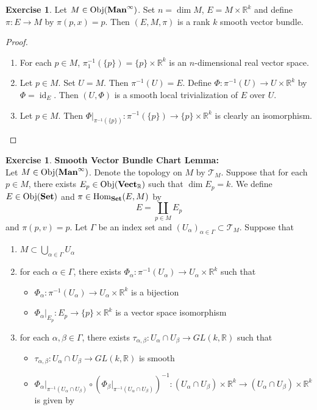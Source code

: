 \documentclass{book}
\theoremstyle{definition}
\newtheorem{ex}[definition]{Exercise}
\newcommand{\al}{\alpha}
\newcommand{\be}{\beta}
\newcommand{\Gam}{\Gamma}
\newcommand{\R}{\mathbb{R}}
\newcommand{\MT}{\mathcal{T}}
\DeclareMathOperator{\id}{id}
\DeclareMathOperator{\Obj}{Obj}
\DeclareMathOperator{\Hom}{Hom}
\DeclareMathOperator*{\Set}{\text{\tbf{Set}}}
\DeclareMathOperator*{\Maninf}{\text{\tbf{Man}}^{\infty}}
\DeclareMathOperator*{\VectR}{\text{\tbf{Vect}}_{\R}}
\DeclareMathOperator*{\0}{\mbf{0}}
\DeclareMathOperator*{\1}{\mbf{1}}
\newcommand{\tbf}[1]{\textbf{#1}}
\begin{document}
\begin{ex}
Let $M \in \Obj(\Maninf)$. Set $n = \dim M$, $E = M \times \R^k$ and define $\pi: E \rightarrow M$ by $\pi(p, x) = p $. Then $(E, M, \pi)$ is a rank $k$ smooth vector bundle.
\end{ex}

\begin{proof}\
\begin{enumerate}
\item For each $p \in M$, $\pi_1^{-1}(\{p\}) = \{p\} \times \R^k$ is an $n$-dimensional real vector space.
\item Let $p \in M$. Set $U = M$. Then $\pi^{-1}(U) = E$. Define $\Phi: \pi^{-1}(U) \rightarrow U \times \R^k$ by $\Phi = \id_E$. Then $(U, \Phi)$ is a smooth local trivialization of $E$ over $U$.   
\item Let $p \in M$. Then $\Phi|_{\pi^{-1}(\{p\})}: \pi^{-1}(\{p\}) \rightarrow \{p\} \times \R^k$ is clearly an isomorphism. 
\end{enumerate}
\end{proof}


\begin{ex} \tbf{Smooth Vector Bundle Chart Lemma:} \\
	Let $M \in \Obj(\Maninf)$. Denote the topology on $M$ by $\MT_M$. Suppose that for each $p \in M$, there exists $E_p \in \Obj(\VectR)$ such that $\dim E_p = k$. We define $E \in \Obj(\Set)$ and $\pi \in \Hom_{\Set}(E, M)$ by
	$$E = \coprod_{p \in M} E_p$$ 
	and 
	$\pi(p, v) = p$. Let $\Gam$ be an index set and $(U_{\al})_{\al \in \Gam} \subset \MT_M$. Suppose that
	\begin{enumerate}
		\item $M \subset \bigcup\limits_{\al \in \Gam} U_{\al}$
		\item for each $\al \in \Gam$, there exists $\Phi_{\al}: \pi^{-1}(U_{\al}) \rightarrow U_{\al} \times \R^k$ such that 
		\begin{itemize}
			\item $\Phi_{\al} : \pi^{-1}(U_{\al}) \rightarrow U_{\al} \times \R^k$ is a bijection
			\item $\Phi_{\al}|_{E_p}:E_p \rightarrow \{p\} \times \R^k$ is a vector space isomorphism
		\end{itemize}
		\item for each $\al, \be \in \Gam$, there exists $\tau_{\al, \be}: U_{\al} \cap U_{\be} \rightarrow GL(k, \R)$ such that 
		\begin{itemize}
			\item $\tau_{\al, \be}: U_{\al} \cap U_{\be} \rightarrow GL(k, \R)$ is smooth
			\item $\Phi_{\al}|_{\pi^{-1}(U_{\al} \cap U_{\be})} \circ (\Phi_{\be}|_{\pi^{-1}(U_{\al} \cap U_{\be})})^{-1}: (U_{\al} \cap U_{\be}) \times \R^k \rightarrow (U_{\al} \cap U_{\be}) \times \R^k$ is given by 
			$$$$
		\end{itemize}
	\end{enumerate}
	
\end{ex}
	
\end{document}
